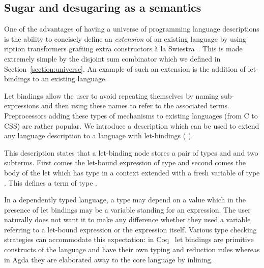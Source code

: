 \subsection{Sugar and desugaring as a semantics}\label{section:letbinding}

One of the advantages of having a universe of programming language
descriptions is the ability to concisely define an \emph{extension}
of an existing language by using ription transformers
grafting extra constructors à la Swiestra~\citeyear{swierstra_2008}.
This is made extremely simple by the disjoint sum combinator
 which we defined in Section~\ref{section:universe}.
An example of such an extension is the addition of let-bindings to
an existing language.

Let bindings allow the user to avoid repeating themselves by naming
sub-expressions and then using these names to refer to the associated
terms. Preprocessors adding these types of mechanisms to existing
languages (from C to CSS) are rather popular. We introduce a
description  which can be used to extend any language
description  to a language with let-bindings ( 
).

\begin{minipage}{\textwidth}
\begin{minipage}[t]{0.45\textwidth}
\end{minipage}
\begin{minipage}[t]{0.45\textwidth}
\end{minipage}
\end{minipage}

This description states that a let-binding node stores a pair of types
\AB{$\sigma$} and \AB{$\tau$} and two subterms. First comes the let-bound
expression of type \AB{$\sigma$} and second comes the body of the let which
has type \AB{$\tau$} in a context extended with a fresh variable of type
\AB{$\sigma$}. This defines a term of type \AB{$\tau$}.

In a dependently typed language, a type may depend on a value which
in the presence of let bindings may be a variable standing for an
expression. The user naturally does not want it to make any difference
whether they used a variable referring to a let-bound expression or
the expression itself. Various type checking strategies can accommodate
this expectation: in Coq~\cite{Coq:manual} let bindings are primitive
constructs of the language and have their own typing and reduction
rules whereas in Agda they are elaborated away to the core language
by inlining.

